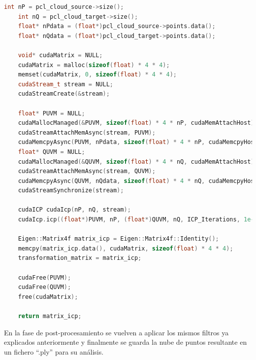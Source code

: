 \begin{lstlisting}[language={C++}, caption={Preparación y llamada al algoritmo de CUDA-ICP}, label={lst:cuda-icp}]
    int nP = pcl_cloud_source->size();
    int nQ = pcl_cloud_target->size();
    float* nPdata = (float*)pcl_cloud_source->points.data();
    float* nQdata = (float*)pcl_cloud_target->points.data();

    void* cudaMatrix = NULL;
    cudaMatrix = malloc(sizeof(float) * 4 * 4);
    memset(cudaMatrix, 0, sizeof(float) * 4 * 4);
    cudaStream_t stream = NULL;
    cudaStreamCreate(&stream);

    float* PUVM = NULL;
    cudaMallocManaged(&PUVM, sizeof(float) * 4 * nP, cudaMemAttachHost);
    cudaStreamAttachMemAsync(stream, PUVM);
    cudaMemcpyAsync(PUVM, nPdata, sizeof(float) * 4 * nP, cudaMemcpyHostToDevice, stream);
    float* QUVM = NULL;
    cudaMallocManaged(&QUVM, sizeof(float) * 4 * nQ, cudaMemAttachHost);
    cudaStreamAttachMemAsync(stream, QUVM);
    cudaMemcpyAsync(QUVM, nQdata, sizeof(float) * 4 * nQ, cudaMemcpyHostToDevice, stream);
    cudaStreamSynchronize(stream);

    cudaICP cudaIcp(nP, nQ, stream);
    cudaIcp.icp((float*)PUVM, nP, (float*)QUVM, nQ, ICP_Iterations, 1e-20, cudaMatrix, stream);

    Eigen::Matrix4f matrix_icp = Eigen::Matrix4f::Identity();
    memcpy(matrix_icp.data(), cudaMatrix, sizeof(float) * 4 * 4);
    transformation_matrix = matrix_icp;

    cudaFree(PUVM);
    cudaFree(QUVM);
    free(cudaMatrix);

    return matrix_icp;
\end{lstlisting}

En la fase de post-procesamiento se vuelven a aplicar los mismos filtros ya explicados anteriormente y finalmente se guarda la nube de puntos resultante en un fichero ``.ply'' para su análisis.
